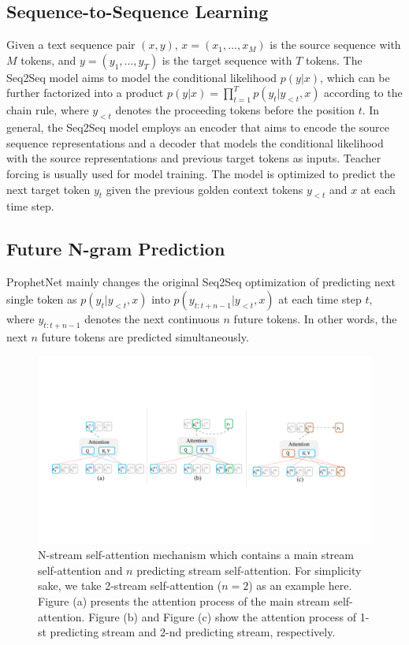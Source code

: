 \documentclass[11pt,a4paper]{article}
\begin{document}
\subsection{Sequence-to-Sequence Learning}
Given a text sequence pair $(x, y)$, $x = (x_1, \dots, x_M)$ is the source sequence with $M$ tokens, and $y = (y_1, \dots, y_T)$ is the target sequence with $T$ tokens.
The Seq2Seq model aims to model the conditional likelihood $p(y | x)$, which can be further factorized into a product $p(y | x) = \prod^{T}_{t=1} p(y_t | y_{<t},
x)$ according to the chain rule, where $y_{<t}$ denotes the proceeding tokens before the position $t$.
In general, the Seq2Seq model employs an encoder that aims to encode the source sequence representations and a decoder that models the conditional likelihood with the source representations and previous target tokens as inputs.
Teacher forcing is usually used for model training. The model is optimized to predict the next target token $y_t$ given the previous golden context tokens $y_{<t}$ and $x$ at each time step.

\subsection{Future N-gram Prediction} \label{sec:m1}
ProphetNet mainly changes the original Seq2Seq optimization of predicting next single token as $p(y_{t}|y_{<t}, x)$ into $p(y_{t:t+n-1}|y_{<t}, x)$ at each time step $t$, where $y_{t:t+n-1}$ denotes the next continuous $n$ future tokens.
In other words, the next $n$ future tokens are predicted simultaneously. 


\begin{figure}[h]
    \centering
	\includegraphics[width = 6.3 in]{nstream.pdf}
	\caption{N-stream self-attention mechanism which contains a main stream self-attention and $n$ predicting stream self-attention. For simplicity sake, we take 2-stream self-attention ($n=2$) as an example here. Figure (a) presents the attention process of the main stream self-attention. Figure (b) and Figure (c) show the attention process of 1-st predicting stream and 2-nd predicting stream, respectively. }\label {fig:nstream}
\end{figure}
\end{document}
